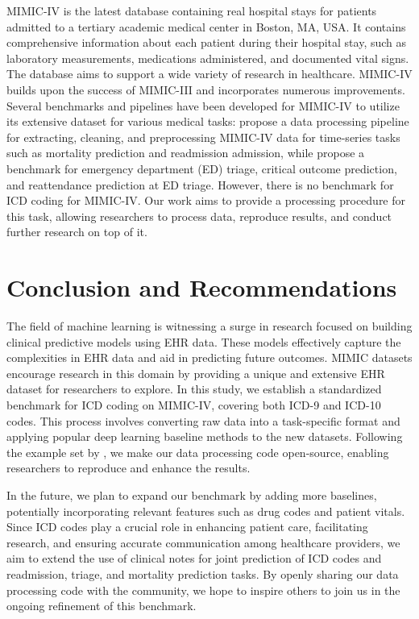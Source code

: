 \documentclass[11pt]{article}
\begin{document}
MIMIC-IV is the latest database containing real hospital stays for patients admitted to a tertiary academic medical center in Boston, MA, USA. It contains comprehensive information about each patient during their hospital stay, such as laboratory measurements, medications administered, and documented vital signs. The database aims to support a wide variety of research in healthcare. MIMIC-IV builds upon the success of MIMIC-III and incorporates numerous improvements. Several benchmarks and pipelines have been developed for MIMIC-IV to utilize its extensive dataset for various medical tasks: \citep{DBLP:conf/ml4h/GuptaGCDPB22} propose a data processing pipeline for extracting, cleaning, and preprocessing MIMIC-IV data for time-series tasks such as mortality prediction and readmission admission, while \citep{DBLP:conf/amia/XieZLTLRCCWDOGL22} propose a benchmark for emergency department (ED) triage, critical outcome prediction, and reattendance prediction at ED triage. However, there is no benchmark for ICD coding for MIMIC-IV. Our work aims to provide a processing procedure for this task, allowing researchers to process data, reproduce results, and conduct further research on top of it.

\section{Conclusion and Recommendations}

The field of machine learning is witnessing a surge in research focused on building clinical predictive models using EHR data. These models effectively capture the complexities in EHR data and aid in predicting future outcomes. MIMIC datasets encourage research in this domain by providing a unique and extensive EHR dataset for researchers to explore. In this study, we establish a standardized benchmark for ICD coding on MIMIC-IV, covering both ICD-9 and ICD-10 codes. This process involves converting raw data into a task-specific format and applying popular deep learning baseline methods to the new datasets. Following the example set by \citep{mullenbach-etal-2018-explainable}, we make our data processing code open-source, enabling researchers to reproduce and enhance the results. 

In the future, we plan to expand our benchmark by adding more baselines, potentially incorporating relevant features such as drug codes and patient vitals. Since ICD codes play a crucial role in enhancing patient care, facilitating research, and ensuring accurate communication among healthcare providers, we aim to extend the use of clinical notes for joint prediction of ICD codes and readmission, triage, and mortality prediction tasks. By openly sharing our data processing code with the community, we hope to inspire others to join us in the ongoing refinement of this benchmark.





\end{document}
